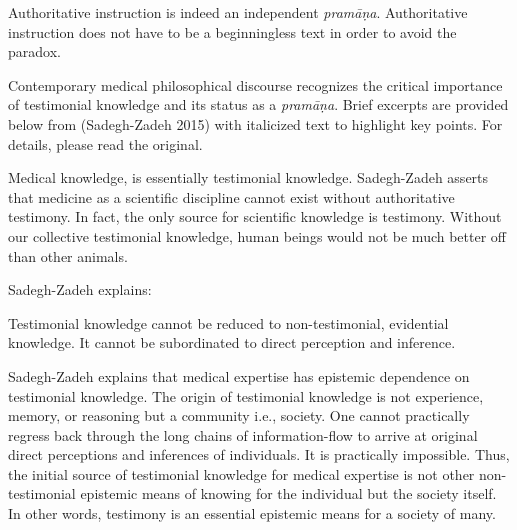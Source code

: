 Authoritative instruction is indeed an independent {{\sl pramāṇa}\relax}.  Authoritative instruction does not have to be a beginningless text in order to avoid the paradox.

Contemporary medical philosophical discourse recognizes the critical importance of testimonial knowledge and its status as a {\sl pramāṇa}.  Brief excerpts are provided below from (Sadegh-Zadeh 2015) with italicized text to highlight key points. For details, please read the original.
  
Medical knowledge, is essentially testimonial knowledge. Sadegh-Zadeh  asserts that medicine as a scientific discipline cannot exist without authoritative testimony. In fact, the only source for scientific knowledge is testimony. Without our collective testimonial knowledge, human beings would not be much better off than other animals.  

Sadegh-Zadeh explains:

Testimonial knowledge cannot be reduced to non-testimonial, evidential knowledge. It cannot be subordinated to direct perception and inference.

Sadegh-Zadeh explains that medical expertise has epistemic dependence on testimonial knowledge.  The origin of testimonial knowledge is not experience, memory, or reasoning but a community i.e., society.  One cannot practically regress back through the long chains of information-flow to arrive at original direct perceptions and inferences of individuals.  It is practically impossible.  Thus, the initial source of testimonial knowledge for medical expertise is not other non-testimonial epistemic means of knowing for the individual but the society itself.  In other words, testimony is an essential epistemic means for a society of many.

